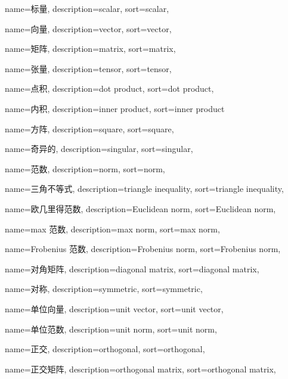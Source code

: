 {
  name=标量,
  description={scalar},
  sort={scalar},
}

{
  name=向量,
  description={vector},
  sort={vector},
}

{
  name=矩阵,
  description={matrix},
  sort={matrix},
}

{
  name=张量,
  description={tensor},
  sort={tensor},
}

{
  name=点积,
  description={dot product},
  sort={dot product},
}

{
  name=内积,
  description={inner product},
  sort={inner product}
}

{
  name=方阵,
  description={square},
  sort={square},
}

{
  name=奇异的,
  description={singular},
  sort={singular},
}

{
  name=范数,
  description={norm},
  sort={norm},
}

{
  name=三角不等式,
  description={triangle inequality},
  sort={triangle inequality},
}

{
  name=欧几里得范数,
  description={Euclidean norm},
  sort={Euclidean norm},
}

{
  name=max 范数,
  description={max norm},
  sort={max norm},
}

{
  name=Frobenius 范数,
  description={Frobenius norm},
  sort={Frobenius norm},
}

{
  name=对角矩阵,
  description={diagonal matrix},
  sort={diagonal matrix},
}

{
  name=对称,
  description={symmetric},
  sort={symmetric},
}

{
  name=单位向量,
  description={unit vector},
  sort={unit vector},
}

{
  name=单位范数,
  description={unit norm},
  sort={unit norm},
}

{
  name=正交,
  description={orthogonal},
  sort={orthogonal},
}

{
  name=正交矩阵,
  description={orthogonal matrix},
  sort={orthogonal matrix},
}

